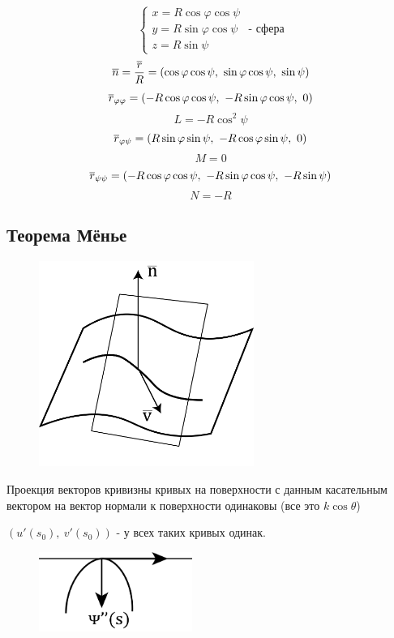 \documentclass[main]{subfiles}
\begin{document}
	\begin{Example}
		\[\begin{cases}
			x = R \cos \varphi \cos \psi\\
			y = R \sin \varphi \cos \psi\\
			z = R \sin \psi
		\end{cases} \text{ - сфера}\]
		\[\overline{n} = \dfrac{\overline{r}}{R} = (\cos \varphi \cos \psi,\ \sin \varphi \cos \psi,\ \sin \psi)\]
		\[\overline{r}_{\varphi \varphi} = (-R \cos \varphi \cos \psi,\ -R \sin \varphi \cos \psi,\ 0)\]
		\[L = -R \cos^2 \psi\]
		\[\overline{r}_{\varphi \psi} = (R \sin \varphi \sin \psi,\ -R \cos \varphi \sin \psi,\ 0)\]
		\[M = 0\]
		\[\overline{r}_{\psi \psi} = (-R \cos \varphi \cos \psi,\ -R \sin \varphi \cos \psi,\ -R \sin \psi)\]
		\[N = -R\]
	\end{Example}

	\subsection{Теорема Мёнье}
	\begin{figure}[H]
		\centering
		\includegraphics[width=7cm]{pics/7_7.png}
	\end{figure}
	\begin{theorem}[Мёнье?]
		Проекция векторов кривизны кривых на поверхности с данным касательным вектором на вектор нормали к поверхности одинаковы (все это $k \cos \theta$)
	\end{theorem}
	$(u'(s_0),\ v'(s_0)) \text{ - у всех таких кривых одинак.}$
	\begin{figure}[H]
		\centering
		\includegraphics[width=5cm]{pics/7_8.png}
	\end{figure}
\end{document}
